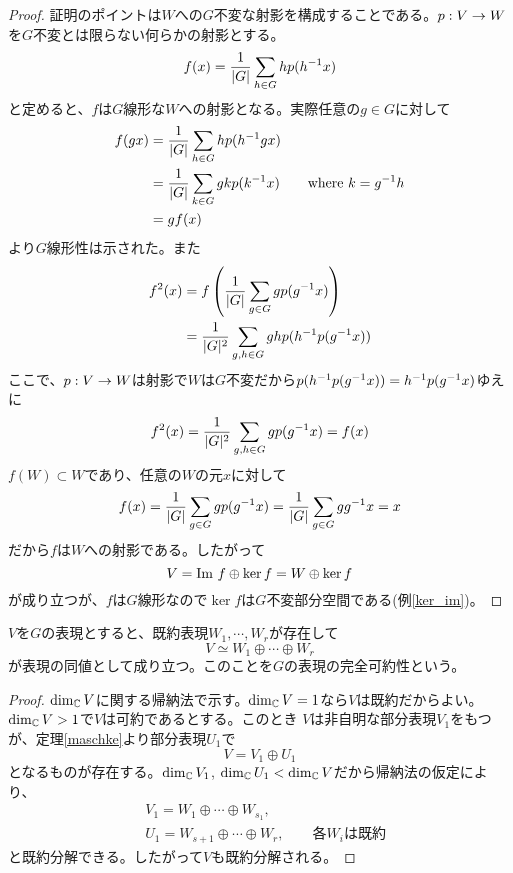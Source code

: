 \documentclass{ltjsreport}
\begin{document}
  \begin{proof}
    証明のポイントは$W$への$G$不変な射影を構成することである。$p:V\rightarrow W$を$G$不変とは限らない何らかの射影とする。
    \[
    f(x)=\frac{1}{|G|}\sum_{h\in G} hp(h^{-1}x)
    \]
    と定めると、$f$は$G$線形な$W$への射影となる。実際任意の$g\in G$に対して
    \begin{align*}
      f(gx)&=\frac{1}{|G|}\sum_{h\in G} hp(h^{-1}gx)\\
      &=\frac{1}{|G|}\sum_{k\in G} gkp(k^{-1}x)\qquad \text{where $k=g^{-1}h$}\\
      &=gf(x)
    \end{align*}
    より$G$線形性は示された。また
    \begin{align*}
      f^2(x)&=f\left(\frac{1}{|G|}\sum_{g\in G}gp(g^{-1}x)\right)\\
      &=\frac{1}{|G|^2}\sum_{g,h\in G}ghp(h^{-1}p(g^{-1}x))
    \end{align*}
    ここで、$p:V\rightarrow W$は射影で$W$は$G$不変だから$p(h^{-1}p(g^{-1}x))=h^{-1}p(g^{-1}x)$ゆえに
    \begin{align*}
      f^2(x)=\frac{1}{|G|^2}\sum_{g,h\in G}gp(g^{-1}x)=f(x)
    \end{align*}
    $f(W)\subset W$であり、任意の$W$の元$x$に対して
    \[
    f(x)=\frac{1}{|G|}\sum_{g\in G}gp(g^{-1}x)=\frac{1}{|G|}\sum_{g\in G}gg^{-1}x=x  
    \]
    だから$f$は$W$への射影である。したがって
    \[
    V=\text{Im } f\oplus \ker f=W\oplus \ker f  
    \]
    が成り立つが、$f$は$G$線形なので$\ker f$は$G$不変部分空間である(例\ref{ker_im})。
  \end{proof}


\begin{cor}\label{irr_decompose}
  $V$を$G$の表現とすると、既約表現$W_1,\cdots,W_r$が存在して
  \[
  V\simeq W_1\oplus\cdots\oplus W_r  
  \]
  が表現の同値として成り立つ。このことを$G$の表現の完全可約性という。
\end{cor}

\begin{proof}
  $\dim_{\mathbb{C}} V$に関する帰納法で示す。$\dim_{\mathbb{C}} V=1$なら$V$は既約だからよい。$\dim_{\mathbb{C}} V>1$で$V$は可約であるとする。このとき
  $V$は非自明な部分表現$V_1$をもつが、定理\ref{maschke}より部分表現$U_1$で
  \[
  V=V_1\oplus U_1  
  \]
  となるものが存在する。$\dim_{\mathbb{C}} V_1$, $\dim_{\mathbb{C}} U_1<\dim_{\mathbb{C}} V$だから帰納法の仮定により、
  \begin{align*}
    &V_1=W_1\oplus\cdots\oplus W_{s_1},\\
    &U_1=W_{s+1}\oplus\cdots\oplus W_{r},\qquad\text{各$W_i$は既約}
  \end{align*}
  と既約分解できる。したがって$V$も既約分解される。
\end{proof}
\end{document}
